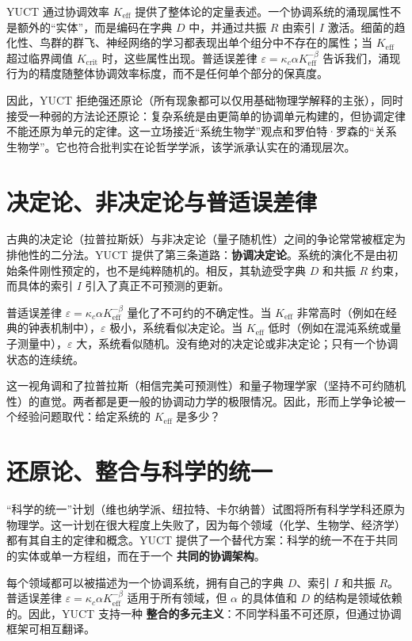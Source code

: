 \documentclass[12pt,a4paper]{article}
\begin{document}
	YUCT 通过协调效率 \(K_{\mathrm{eff}}\) 提供了整体论的定量表述。一个协调系统的涌现属性不是额外的“实体”，而是编码在字典 \(D\) 中，并通过共振 \(R\) 由索引 \(I\) 激活。细菌的趋化性、鸟群的群飞、神经网络的学习都表现出单个组分中不存在的属性；当 \(K_{\mathrm{eff}}\) 超过临界阈值 \(K_{\mathrm{crit}}\) 时，这些属性出现。普适误差律 \(\varepsilon = \kappa_c \alpha K_{\mathrm{eff}}^{-\beta}\) 告诉我们，涌现行为的精度随整体协调效率标度，而不是任何单个部分的保真度。
	
	因此，YUCT 拒绝强还原论（所有现象都可以仅用基础物理学解释的主张），同时接受一种弱的方法论还原论：复杂系统是由更简单的协调单元构建的，但协调定律不能还原为单元的定律。这一立场接近“系统生物学”观点和罗伯特·罗森的“关系生物学”。它也符合批判实在论哲学学派，该学派承认实在的涌现层次。
	
	\section{决定论、非决定论与普适误差律}
	
	古典的决定论（拉普拉斯妖）与非决定论（量子随机性）之间的争论常常被框定为排他性的二分法。YUCT 提供了第三条道路：\textbf{协调决定论}。系统的演化不是由初始条件刚性预定的，也不是纯粹随机的。相反，其轨迹受字典 \(D\) 和共振 \(R\) 约束，而具体的索引 \(I\) 引入了真正不可预测的更新。
	
	普适误差律 \(\varepsilon = \kappa_c \alpha K_{\mathrm{eff}}^{-\beta}\) 量化了不可约的不确定性。当 \(K_{\mathrm{eff}}\) 非常高时（例如在经典的钟表机制中），\(\varepsilon\) 极小，系统看似决定论。当 \(K_{\mathrm{eff}}\) 低时（例如在混沌系统或量子测量中），\(\varepsilon\) 大，系统看似随机。没有绝对的决定论或非决定论；只有一个协调状态的连续统。
	
	这一视角调和了拉普拉斯（相信完美可预测性）和量子物理学家（坚持不可约随机性）的直觉。两者都是更一般的协调动力学的极限情况。因此，形而上学争论被一个经验问题取代：给定系统的 \(K_{\mathrm{eff}}\) 是多少？
	
	\section{还原论、整合与科学的统一}
	
	“科学的统一”计划（维也纳学派、纽拉特、卡尔纳普）试图将所有科学学科还原为物理学。这一计划在很大程度上失败了，因为每个领域（化学、生物学、经济学）都有其自主的定律和概念。YUCT 提供了一个替代方案：科学的统一不在于共同的实体或单一方程组，而在于一个 \textbf{共同的协调架构}。
	
	每个领域都可以被描述为一个协调系统，拥有自己的字典 \(D\)、索引 \(I\) 和共振 \(R\)。普适误差律 \(\varepsilon = \kappa_c \alpha K_{\mathrm{eff}}^{-\beta}\) 适用于所有领域，但 \(\alpha\) 的具体值和 \(D\) 的结构是领域依赖的。因此，YUCT 支持一种 \textbf{整合的多元主义}：不同学科虽不可还原，但通过协调框架可相互翻译。
	
\end{document}
